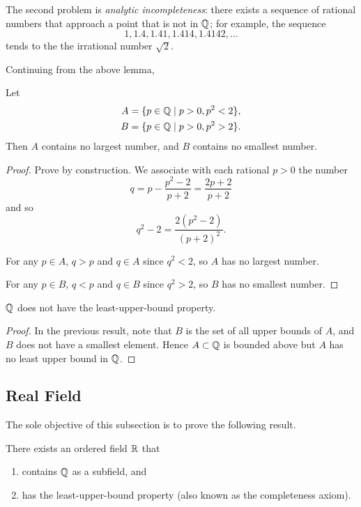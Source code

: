 The second problem is \emph{analytic incompleteness}: there exists a sequence of rational numbers that approach a point that is not in $\mathbb Q$; for example, the sequence
\[1,1.4,1.41,1.414,1.4142,\dots\]
tends to the the irrational number $\sqrt{2}$.

Continuing from the above lemma,
\begin{lemma}
Let
\begin{align*}
A&=\{p\in\mathbb Q\mid p>0,p^2<2\},\\
B&=\{p\in\mathbb Q\mid p>0,p^2>2\}.
\end{align*}
Then $A$ contains no largest number, and $B$ contains no smallest number.
\end{lemma}

\begin{proof}
Prove by construction. We associate with each rational $p>0$ the number
\[q=p-\frac{p^2-2}{p+2}=\frac{2p+2}{p+2}\]
and so
\[q^2-2=\frac{2(p^2-2)}{(p+2)^2}.\]

For any $p\in A$, $q>p$ and $q\in A$ since $q^2<2$, so $A$ has no largest number.

For any $p\in B$, $q<p$ and $q\in B$ since $q^2>2$, so $B$ has no smallest number.
\end{proof}

\begin{proposition}
$\mathbb Q$ does not have the least-upper-bound property.
\end{proposition}

\begin{proof}
In the previous result, note that $B$ is the set of all upper bounds of $A$, and $B$ does not have a smallest element. Hence $A\subset\mathbb Q$ is bounded above but $A$ has no least upper bound in $\mathbb Q$.
\end{proof}

\subsection{Real Field}
The sole objective of this subsection is to prove the following result.

\begin{theorem}
There exists an ordered field $\mathbb R$ that
\begin{enumerate}[label=(\roman*)]
\item contains $\mathbb Q$ as a subfield, and
\item has the least-upper-bound property (also known as the completeness axiom).
\end{enumerate}
\end{theorem}

